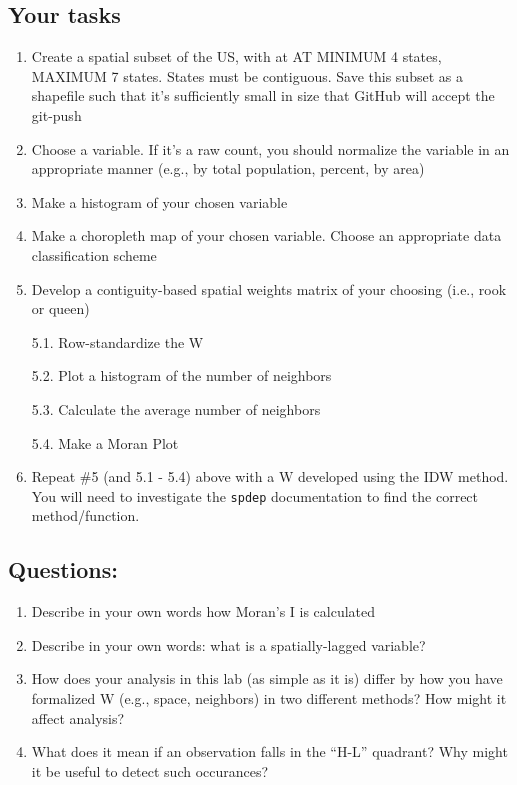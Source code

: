 \documentclass[]{article}
\begin{document}
\subsection{Your tasks}\label{your-tasks}

\begin{enumerate}
\def\labelenumi{\arabic{enumi}.}
\item
  Create a spatial subset of the US, with at AT MINIMUM 4 states,
  MAXIMUM 7 states. States must be contiguous. Save this subset as a
  shapefile such that it's sufficiently small in size that GitHub will
  accept the git-push
\item
  Choose a variable. If it's a raw count, you should normalize the
  variable in an appropriate manner (e.g., by total population, percent,
  by area)
\item
  Make a histogram of your chosen variable
\item
  Make a choropleth map of your chosen variable. Choose an appropriate
  data classiﬁcation scheme
\item
  Develop a contiguity-based spatial weights matrix of your choosing
  (i.e., rook or queen)

  5.1. Row-standardize the W

  5.2. Plot a histogram of the number of neighbors

  5.3. Calculate the average number of neighbors

  5.4. Make a Moran Plot
\item
  Repeat \#5 (and 5.1 - 5.4) above with a W developed using the IDW
  method. You will need to investigate the \texttt{spdep} documentation
  to find the correct method/function.
\end{enumerate}

\subsection{Questions:}\label{questions}

\begin{enumerate}
\def\labelenumi{\arabic{enumi}.}
\item
  Describe in your own words how Moran's I is calculated
\item
  Describe in your own words: what is a spatially-lagged variable?
\item
  How does your analysis in this lab (as simple as it is) differ by how
  you have formalized W (e.g., space, neighbors) in two diﬀerent
  methods? How might it affect analysis?
\item
  What does it mean if an observation falls in the ``H-L'' quadrant? Why
  might it be useful to detect such occurances?
\end{enumerate}
\end{document}

